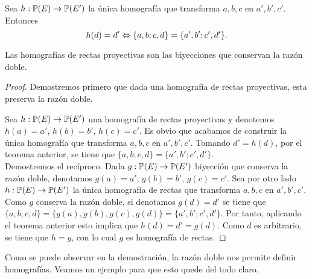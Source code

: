  Sea $h:\mathbb{P}(E)\rightarrow \mathbb{P}(E')$ la única  homografía que transforma $a,b,c$ en $a',b',c'$. Entonces 
\begin{equation}
		h(d)=d' \Leftrightarrow \{a,b;c,d\}=\{a',b';c',d'\}.
\end{equation}
\begin{cor}
	Las homografías de rectas proyectivas son las biyecciones que conservan la razón doble.
\end{cor}
\begin{proof}
	Demostremos primero que dada una homografía de rectas proyectivas, esta preserva la razón doble. 
	
	Sea $h:\mathbb{P}(E)\rightarrow \mathbb{P}(E')$ una homografía de rectas proyectivas y denotemos $h(a)=a'$, $h(b)=b'$, $h(c)=c'$. Es obvio que acabamos de construir la única homografía que transforma $a,b,c$ en $a',b',c'$. Tomando $d'=h(d)$, por el teorema anterior, se tiene que $\{a,b;c,d\}=\{a',b';c',d'\}$.\\
	
	Demostremos el recíproco. Dada $g:\mathbb{P}(E)\rightarrow \mathbb{P}(E')$ biyección que conserva la razón doble, denotamos $g(a)=a'$, $g(b)=b'$, $g(c)=c'$. Sea por otro lado $h:\mathbb{P}(E)\rightarrow \mathbb{P}(E')$ la única homografía de rectas que transforma $a,b,c$ en $a',b',c'$. Como $g$ conserva la razón doble, si denotamos $g(d)=d'$ se tiene que $\{a,b;c,d\}= \{g(a),g(b),g(c),g(d)\}=\{a',b';c',d'\}$. Por tanto, aplicando el teorema anterior esto implica que $h(d)=d'=g(d)$. Como $d$ es arbitrario, se tiene que $h=g$, con lo cual $g$ es homografía de rectas.
\end{proof}
Como se puede observar en la demostración, la razón doble nos permite definir homografías. Veamos un ejemplo para que esto quede del todo claro.
